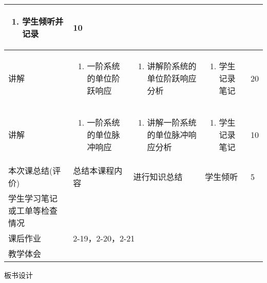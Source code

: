 {\begin{landscape}
\begin{longtable}{|m{10mm}|m{50mm}|m{50mm}|m{50mm}|m{15mm}|}
\begin{enumerate}
\item 学生倾听并记录
\end{enumerate} &10 \\\hline
讲解&\begin{enumerate}
\item 一阶系统的单位阶跃响应
\end{enumerate}
 &\begin{enumerate}
\item 讲解阶系统的单位阶跃响应分析
\end{enumerate} &\begin{enumerate}
\item 学生记录笔记
\end{enumerate} &20 \\\hline
讲解&
\begin{enumerate}
\item 一阶系统的单位脉冲响应
\end{enumerate}
 &\begin{enumerate}
\item 讲解一阶系统的单位脉冲响应分析
\end{enumerate} &\begin{enumerate}
\item 学生记录笔记
\end{enumerate} &10 \\\hline
\centering 本次课总结(评价)&总结本课程内容 &进行知识总结 &学生倾听 &5 \\\hline
\centering 学生学习笔记或工单等检查情况&\multicolumn{4}{m{165mm}|}{\quad}\\\hline
\centering 课后作业&\multicolumn{4}{m{165mm}|}{2-19，2-20，2-21}\\\hline
\centering 教学体会&\multicolumn{4}{m{165mm}|}{\quad}\\
\end{longtable}

\end{landscape}
\clearpage
\begin{center}
{\huge 板书设计}
\end{center}
}

